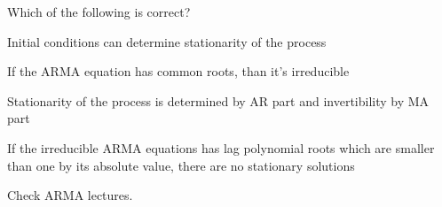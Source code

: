 
\begin{question}
Which of the following is correct?
\begin{answerlist}
  \item Initial conditions can determine stationarity of the process
  \item If the ARMA equation has common roots, than it's irreducible
  \item Stationarity of the process is determined by AR part and invertibility by MA part
  \item If the irreducible ARMA equations has lag polynomial roots which are smaller than one by its absolute value, there are no stationary solutions
\end{answerlist}
\end{question}

\begin{solution}
Check ARMA lectures.
\end{solution}

